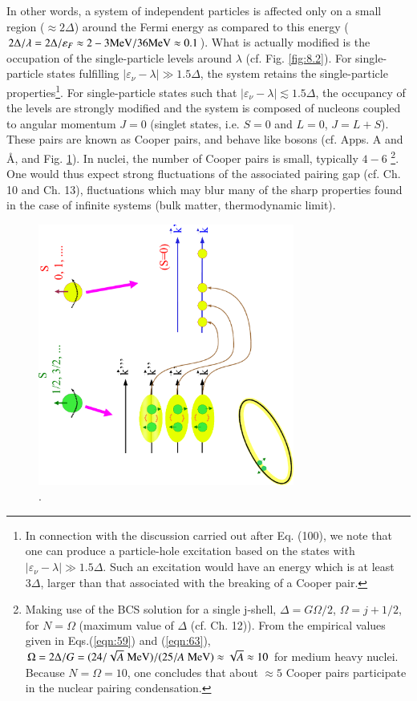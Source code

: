 \documentclass[a4paper,14pt]{book}
\begin{document}
In other words, a system of independent particles is affected only on a small region ($\approx 2 \Delta$) around the Fermi energy as compared to this energy ($2\Delta/\lambda = 2\Delta/\varepsilon_F \approx 2-3 {\rm MeV}/36 {\rm MeV} \approx 0.1$). What is actually modified is the occupation of the single-particle levels around $\lambda$ (cf. Fig. \ref{fig:8.2}). For single-particle states fulfilling $|\varepsilon_{\nu} - \lambda| \gg 1.5 \Delta$, the system retains the single-particle properties\footnote{In connection with the discussion carried out after Eq. (100), we note that one can produce a particle-hole excitation based on the states with $|\varepsilon_{\nu} - \lambda| \gg 1.5 \Delta$. Such an excitation would have an energy which is at least $3 \Delta$, larger than that associated with the breaking of a Cooper pair.}. For single-particle states such that $|\varepsilon_{\nu} - \lambda| \lesssim 1.5 \Delta$, the occupancy of the levels are strongly modified and the system is composed of nucleons coupled to angular momentum $J=0$ (singlet states, i.e. $S=0$ and $L=0$, $J=L+S$). These pairs are known as Cooper pairs, and behave like bosons (cf. Apps. A and \AA , and Fig. \ref{fig:8.3}). In nuclei, the number of Cooper pairs is small, typically $4-6$ \footnote{Making use of the BCS solution for a single j-shell, $\Delta = G\Omega/2$, $\Omega = j+1/2$, for $N=\Omega$ (maximum value of $\Delta$ (cf. Ch. 12)). From the empirical values given in Eqs.(\ref{eqn:59}) and (\ref{eqn:63}), $\Omega = 2\Delta/G = (24/\sqrt{A} \;{\rm MeV})/(25/A \; {\rm MeV}) \approx \sqrt{A} \approx 10$ for medium heavy nuclei. Because $N=\Omega = 10$, one concludes that about $\approx 5$ Cooper pairs participate in the nuclear pairing condensation.}. One would thus expect strong fluctuations of the associated pairing gap (cf. Ch. 10 and Ch. 13), fluctuations which may blur many of the sharp properties found in the case of infinite systems (bulk matter, thermodynamic limit).


\begin{figure}[h!]
\centerline{
\includegraphics*[width=0.75\textwidth]{figs_C7S/fig_8_3}
}
\caption{.}
\label{fig:8.3}
\end{figure}
\end{document}
